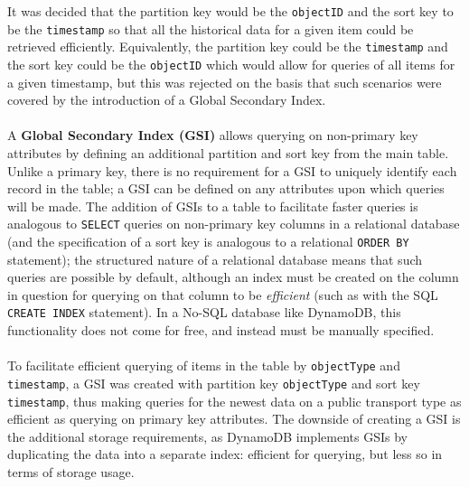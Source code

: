 \documentclass[a4paper,11pt]{report}
\begin{document}
It was decided that the partition key would be the \verb|objectID| and the sort key to be the \verb|timestamp| so that all the historical data for a given item could be retrieved efficiently.
Equivalently, the partition key could be the \verb|timestamp| and the sort key could be the \verb|objectID| which would allow for queries of all items for a given timestamp, but this was rejected on the basis that such scenarios were covered by the introduction of a Global Secondary Index.
\\\\
A \textbf{Global Secondary Index (GSI)} allows querying on non-primary key attributes by defining an additional partition and sort key from the main table\supercite{gsi}.
Unlike a primary key, there is no requirement for a GSI to uniquely identify each record in the table;
a GSI can be defined on any attributes upon which queries will be made.
The addition of GSIs to a table to facilitate faster queries is analogous to \texttt{SELECT} queries on non-primary key columns in a relational database (and the specification of a sort key is analogous to a relational \texttt{ORDER BY} statement);
the structured nature of a relational database means that such queries are possible by default, although an index must be created on the column in question for querying on that column to be \textit{efficient} (such as with the SQL \texttt{CREATE INDEX} statement).
In a No-SQL database like DynamoDB, this functionality does not come for free, and instead must be manually specified.
\\\\
To facilitate efficient querying of items in the table by \verb|objectType| and \verb|timestamp|, a GSI was created with partition key \verb|objectType| and sort key \verb|timestamp|, thus making queries for the newest data on a public transport type as efficient as querying on primary key attributes.
The downside of creating a GSI is the additional storage requirements, as DynamoDB implements GSIs by duplicating the data into a separate index: efficient for querying, but less so in terms of storage usage.
\end{document}
